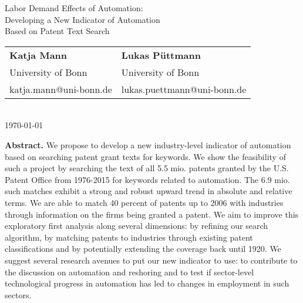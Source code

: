 \documentclass[11pt,a4paper]{article}
\begin{document}
\vspace*{2cm}




\thispagestyle{empty}


\begin{center}
\thispagestyle{empty}
{\huge Labor Demand Effects of Automation:\\[0.2cm] Developing a New Indicator of Automation \\[0.2cm] Based on Patent Text Search}\\[1cm]
\begin{tabular}{l@{\hskip 0.6in}l}
\textbf{{\large Katja Mann}} & \textbf{{\large Lukas Püttmann}}\\
{\small University of Bonn} & {\small University of Bonn}\\
{\small katja.mann@uni-bonn.de} & {\small lukas.puettmann@uni-bonn.de}\\
\end{tabular}\\[0.7cm]
{\large \today}\\[0.7cm]
\end{center}


\vspace*{0.8cm}
\begin{center}
\begin{minipage}{0.8\textwidth}
\textbf{Abstract.} We propose to develop a new industry-level indicator of automation based on searching patent grant texts for keywords. We show the feasibility of such a project by searching the text of all 5.5 mio. patents granted by the U.S. Patent Office from 1976-2015 for keywords related to automation. The 6.9 mio. such matches exhibit a strong and robust upward trend in absolute and relative terms. We are able to match 40 percent of patents up to 2006 with industries through information on the firms being granted a patent. We aim to improve this exploratory first analysis along several dimensions: by refining our search algorithm, by matching patents to industries through existing patent classifications and by potentially extending the coverage back until 1920. We suggest several research avenues to put our new indicator to use: to contribute to the discussion on automation and reshoring and to test if sector-level technological progress in automation has led to changes in employment in such sectors.
\end{minipage}
\end{center}

\end{document}

